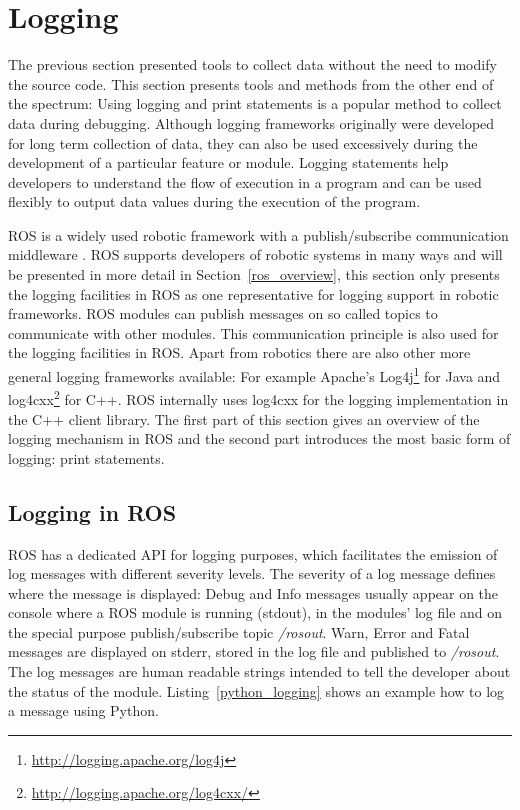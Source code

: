 


\section{Logging}
\label{logging_section}
The previous section presented tools to collect data without the need to modify the source code. This section presents tools and methods from the other end of the spectrum: Using logging and print statements is a popular method to collect data during debugging. Although logging frameworks originally were developed for long term collection of data, they can also be used excessively during the development of a particular feature or module. Logging statements help developers to understand the flow of execution in a program and can be used flexibly to output data values during the execution of the program.

ROS is a widely used robotic framework \cite{Foote2012} with a publish/subscribe communication middleware \cite{Quigley2009}. ROS supports developers of robotic systems in many ways and will be presented in more detail in Section~\ref{ros_overview}, this section only presents the logging facilities in ROS as one representative for logging support in robotic frameworks. ROS modules can publish messages on so called topics to communicate with other modules. This communication principle is also used for the logging facilities in ROS. Apart from robotics there are also other more general logging frameworks available: For example Apache's Log4j\footnote{\url{http://logging.apache.org/log4j}} for Java and log4cxx\footnote{\url{http://logging.apache.org/log4cxx/}} for C++. ROS internally uses log4cxx for the logging implementation in the C++ client library. The first part of this section gives an overview of the logging mechanism in ROS and the second part introduces the most basic form of logging: print statements.

\subsection{Logging in ROS}
\label{ros_logging}

ROS has a dedicated API for logging purposes, which facilitates the emission of log messages with different severity levels. The severity of a log message defines where the message is displayed: Debug and Info messages usually appear on the console where a ROS module is running (stdout), in the modules' log file and on the special purpose publish/subscribe topic \emph{/rosout}. Warn, Error and Fatal messages are displayed on stderr, stored in the log file and published to \emph{/rosout}. The log messages are human readable strings intended to tell the developer about the status of the module. Listing~\ref{python_logging} shows an example how to log a message using Python.

